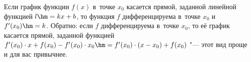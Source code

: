 
    Если график функции $f(x)$ в~точке $x_0$ касается прямой, заданной линейной функцией $l\hm=kx+b$,
     то функция $f$ дифференцируема в~точке $x_0$ и $f'(x_0)\hm=k$. Обратно: если $f$ дифференцируема в~точке $x_0$,
     то её график касается прямой, заданной функцией $f'(x_0)\cdot x+f(x_0)-f'(x_0)\cdot x_0\hm=f'(x_0)\cdot(x-x_0)+f(x_0)$ "--- этот вид проще и для вас привычнее.
